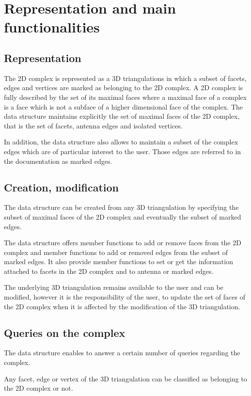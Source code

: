 \section{Representation  and main functionalities}
\label{section_C2inT3_Functionalities}

\subsection{Representation}
The 2D complex is represented as a 3D triangulations in which
a subset of facets, edges and vertices are marked as belonging to the 
2D complex.  
A 2D complex is fully described by the set of its maximal faces
where a maximal face of a complex is a face which is not
a subface of a higher dimensional face of the complex.
The data structure maintains explicitly the set of maximal faces 
of the 2D complex, that is 
the set of facets, antenna edges and isolated vertices.

In addition, the data structure also allows to maintain a subset
of the complex edges which are of particular interest to the user.
Those edges are referred to in the documentation as marked
edges.

\subsection{Creation, modification}
The data structure can be created from any 3D triangulation
by specifying the subset of maximal faces of the 2D complex
and eventually the subset of marked edges.

The data structure offers member functions to add or remove faces from the
2D complex and member functions  to add or removed edges
from the subset of marked edges. It also provide member functions
to set or get the information attached to facets in the 2D complex
and  to antenna or  marked edges.

The underlying 3D triangulation remains  available to the user
and can be modified,  however it is the responsibility
of the user, to update the set of faces of the 2D complex
when  it is affected by  the modification of the 3D triangulation.


\subsection{Queries on the complex}
The data structure enables to answer  a certain number of queries
regarding the complex.

Any facet, edge or vertex  of the  3D triangulation 
can be classified as belonging to the 2D complex or not.

